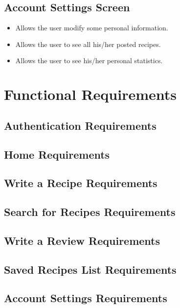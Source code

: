 \begin{itemize}
	\subsection{Account Settings Screen}
		\begin{itemize}
			\item Allows the user modify some personal information.
			
			\item Allows the user to see all his/her posted recipes.
			
			\item Allows the user to see his/her personal statistics.
		\end{itemize}


\section{Functional Requirements}
	\subsection{Authentication Requirements}

	\subsection{Home Requirements}

	\subsection{Write a Recipe Requirements}

	\subsection{Search for Recipes Requirements}

	\subsection{Write a Review Requirements}

	\subsection{Saved Recipes List Requirements}

	\subsection{Account Settings Requirements}



\end{itemize}
